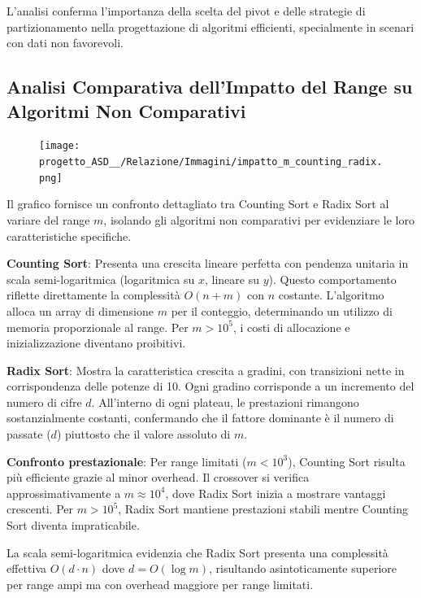 \documentclass[a4paper, 11pt]{article}
\begin{document}
L'analisi conferma l'importanza della scelta del pivot e delle strategie di partizionamento nella progettazione di algoritmi efficienti, specialmente in scenari con dati non favorevoli.

\subsection{Analisi Comparativa dell'Impatto del Range su Algoritmi Non Comparativi}
\begin{figure}[H]
\centering
\texttt{[image: progetto\_ASD\_\_/Relazione/Immagini/impatto\_m\_counting\_radix.png]}
\label{fig:variazione_m}
\end{figure}

Il grafico fornisce un confronto dettagliato tra Counting Sort e Radix Sort al variare del range $m$, isolando gli algoritmi non comparativi per evidenziare le loro caratteristiche specifiche.

\textbf{Counting Sort}: Presenta una crescita lineare perfetta con pendenza unitaria in scala semi-logaritmica (logaritmica su $x$, lineare su $y$). Questo comportamento riflette direttamente la complessità $O(n + m)$ con $n$ costante. L'algoritmo alloca un array di dimensione $m$ per il conteggio, determinando un utilizzo di memoria proporzionale al range. Per $m > 10^5$, i costi di allocazione e inizializzazione diventano proibitivi.

\textbf{Radix Sort}: Mostra la caratteristica crescita a gradini, con transizioni nette in corrispondenza delle potenze di 10. Ogni gradino corrisponde a un incremento del numero di cifre $d$. All'interno di ogni plateau, le prestazioni rimangono sostanzialmente costanti, confermando che il fattore dominante è il numero di passate ($d$) piuttosto che il valore assoluto di $m$.

\textbf{Confronto prestazionale}: Per range limitati ($m < 10^3$), Counting Sort risulta più efficiente grazie al minor overhead. Il crossover si verifica approssimativamente a $m \approx 10^4$, dove Radix Sort inizia a mostrare vantaggi crescenti. Per $m > 10^5$, Radix Sort mantiene prestazioni stabili mentre Counting Sort diventa impraticabile.

La scala semi-logaritmica evidenzia che Radix Sort presenta una complessità effettiva $O(d \cdot n)$ dove $d = O(\log m)$, risultando asintoticamente superiore per range ampi ma con overhead maggiore per range limitati.
\end{document}
